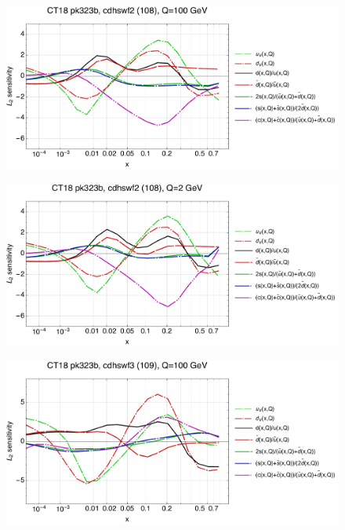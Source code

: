 \documentclass[10pt,aps,prd,floatfix,titlepage]{revtex4}
\begin{document}
\clearpage
\begin{figure}
\includegraphics[width=\textwidth,height=0.44\textheight,keepaspectratio]{2/108_ct18nn_q100_Sf_2.pdf}
\caption{}
\end{figure}
\begin{figure}
\includegraphics[width=\textwidth,height=0.44\textheight,keepaspectratio]{2/108_ct18nn_q2_Sf_2.pdf}
\caption{}
\end{figure}
\clearpage
\begin{figure}
\includegraphics[width=\textwidth,height=0.44\textheight,keepaspectratio]{2/109_ct18nn_q100_Sf_2.pdf}
\caption{}
\end{figure}
\end{document}
